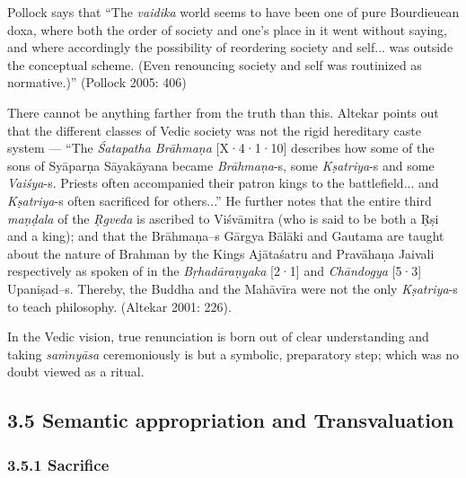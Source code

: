 Pollock says that “The \textit{vaidika} world seems to have been one of pure Bourdieuean doxa, where both the order of society and one’s place in it went without saying, and where accordingly the possibility of reordering society and self... was outside the conceptual scheme. (Even renouncing society and self was routinized as normative.)” (Pollock 2005: 406)

There cannot be anything farther from the truth than this. Altekar points out that the different classes of Vedic society was not the rigid hereditary caste system — “The \textit{Śatapatha Brāhmaṇa} [X·4·1·10] describes how some of the sons of Syāparṇa Sāyakāyana became \textit{Brāhmaṇa}-s, some \textit{Kṣatriya}-s and some \textit{Vaiśya}-s. Priests often accompanied their patron kings to the battlefield... and \textit{Kṣatriya}-s often sacrificed for others...” He further notes that the entire third \textit{maṇḍala} of the \textit{Ṛgveda} is ascribed to Viśvāmitra (who is said to be both a Ṛṣi and a king); and that the Brāhmaṇa--s Gārgya Bālāki and Gautama are taught about the nature of Brahman by the Kings Ajātaśatru and Pravāhaṇa Jaivali respectively as spoken of in the \textit{Bṛhadāraṇyaka} [2·1] and \textit{Chāndogya} [5·3] Upaniṣad--s. Thereby, the Buddha and the Mahāvīra were not the only \textit{Kṣatriya}-s to teach philosophy. (Altekar 2001: 226).

In the Vedic vision, true renunciation is born out of clear understanding and taking \textit{saṁnyāsa} ceremoniously is but a symbolic, preparatory step; which was no doubt viewed as a ritual.


\subsection*{3.5 Semantic appropriation and Transvaluation}

\subsubsection*{3.5.1 Sacrifice}


